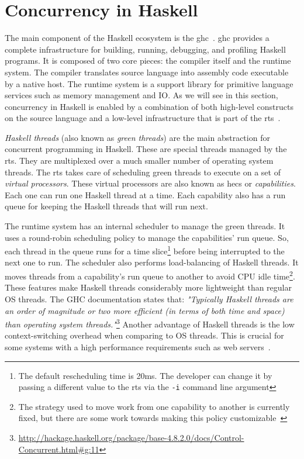 \section{Concurrency in Haskell}\label{sec:haskell-conc}
The main component of the Haskell ecosystem is the \ac{ghc}~\cite{smpj:1993}. \acs{ghc} provides a complete infrastructure for building, running, debugging, and profiling Haskell programs. It is composed of two core pieces: the compiler itself and the runtime system. The compiler translates source language into assembly code executable by a native host. The runtime system is a support library for primitive language services such as memory management and IO. As we will see in this section, concurrency in Haskell is enabled by a combination of both high-level constructs on the source language and a low-level infrastructure that is part of the \ac{rts}~\cite{li:2007}.

\emph{Haskell threads} (also known as \emph{green threads}) are the main abstraction for concurrent programming in Haskell. These are special threads managed by the \acl{rts}. They are multiplexed over a much smaller number of operating system threads. The \ac{rts} takes care of scheduling green threads to execute on a set of \emph{virtual processors}. These virtual processors are also known as \acp{hec} or \emph{capabilities}. Each one can run one Haskell thread at a time. Each capability also has a run queue for keeping the Haskell threads that will run next.

The runtime system has an internal scheduler to manage the green threads. It uses a round-robin scheduling policy to manage the capabilities' run queue. So, each thread in the queue runs for a time slice\footnote{The default rescheduling time is 20ms. The developer can change it by passing a different value to the \ac{rts} via the \texttt{-i} command line argument} before being interrupted to the next one to run. The scheduler also performs load-balancing of Haskell threads. It moves threads from a capability's run queue to another to avoid CPU idle time\footnote{The strategy used to move work from one capability to another is currently fixed, but there are some work towards making this policy customizable~\cite{siva:2014}}. These features make Haskell threads considerably more lightweight than regular OS threads. The GHC documentation states that: \emph{"Typically Haskell threads are an order of magnitude or two more efficient (in terms of both time and space) than operating system threads."}\footnote{\url{http://hackage.haskell.org/package/base-4.8.2.0/docs/Control-Concurrent.html\#g:11}} Another advantage of Haskell threads is the low context-switching overhead when comparing to OS threads. This is crucial for some systems with a high performance requirements such as web servers~\cite{voellmy:2013}.


